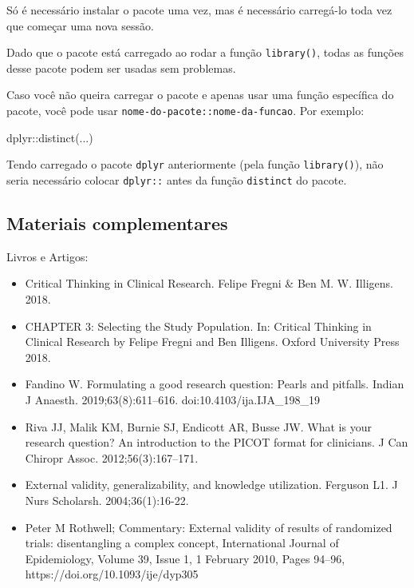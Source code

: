 \documentclass[
  letterpaper,
  DIV=11,
  numbers=noendperiod]{scrreprt}
\newenvironment{Shaded}{\begin{snugshade}}{\end{snugshade}}
\newcommand{\FunctionTok}[1]{\textcolor[rgb]{0.28,0.35,0.67}{#1}}
\newcommand{\NormalTok}[1]{\textcolor[rgb]{0.00,0.23,0.31}{#1}}
\newcommand{\SpecialCharTok}[1]{\textcolor[rgb]{0.37,0.37,0.37}{#1}}
\begin{document}
Só é necessário instalar o pacote uma vez, mas é necessário carregá-lo
toda vez que começar uma nova sessão.

Dado que o pacote está carregado ao rodar a função \texttt{library()},
todas as funções desse pacote podem ser usadas sem problemas.

Caso você não queira carregar o pacote e apenas usar uma função
específica do pacote, você pode usar
\texttt{nome-do-pacote::nome-da-funcao}. Por exemplo:

\begin{Shaded}
\begin{Highlighting}[]
\NormalTok{dplyr}\SpecialCharTok{::}\FunctionTok{distinct}\NormalTok{(...)}
\end{Highlighting}
\end{Shaded}

Tendo carregado o pacote \texttt{dplyr} anteriormente (pela função
\texttt{library()}), não seria necessário colocar \texttt{dplyr::} antes
da função \texttt{distinct} do pacote.

\hypertarget{materiais-complementares-2}{%
\subsection{Materiais complementares}\label{materiais-complementares-2}}

Livros e Artigos:

\begin{itemize}
\item
  Critical Thinking in Clinical Research. Felipe Fregni \& Ben M. W.
  Illigens. 2018.
\item
  CHAPTER 3: Selecting the Study Population. In: Critical Thinking in
  Clinical Research by Felipe Fregni and Ben Illigens. Oxford University
  Press 2018.
\item
  Fandino W. Formulating a good research question: Pearls and pitfalls.
  Indian J Anaesth. 2019;63(8):611--616. doi:10.4103/ija.IJA\_198\_19
\item
  Riva JJ, Malik KM, Burnie SJ, Endicott AR, Busse JW. What is your
  research question? An introduction to the PICOT format for clinicians.
  J Can Chiropr Assoc. 2012;56(3):167--171.
\item
  External validity, generalizability, and knowledge utilization.
  Ferguson L1. J Nurs Scholarsh. 2004;36(1):16-22.
\item
  Peter M Rothwell; Commentary: External validity of results of
  randomized trials: disentangling a complex concept, International
  Journal of Epidemiology, Volume 39, Issue 1, 1 February 2010, Pages
  94--96, https://doi.org/10.1093/ije/dyp305
\end{itemize}
\end{document}
